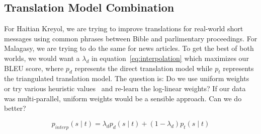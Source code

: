 \documentclass[11pt]{article}
\begin{document}
	

\subsection{Translation Model Combination}
\label{sec:interpolation}
	For Haitian Kreyol, we are trying to improve translations for real-world short messages using common phrases between Bible and parlimentary proceedings. For Malagasy, we are trying to do the same for news articles. To get the best of both worlds, we would want a $\lambda_{d}$ in equation~\eqref{eq:interpolation} which maximizes our BLEU score, where $p_{d}$ represents the direct translation model while $p_{t}$ represents the triangulated translation model. The question is: Do we use uniform weights~\cite{Cohn:07} or try various heuristic values~\cite{Nakov:12} and re-learn the log-linear weights? If our data was multi-parallel, uniform weights would be a sensible approach. Can we do better? 


	\begin{equation} \label{eq:interpolation}
		p_{interp}(s \mid t) = \lambda_{d} p_{d}(s \mid t) + (1 - \lambda_{d}) p_{t}(s \mid t)
	\end{equation}

	
\end{document}
